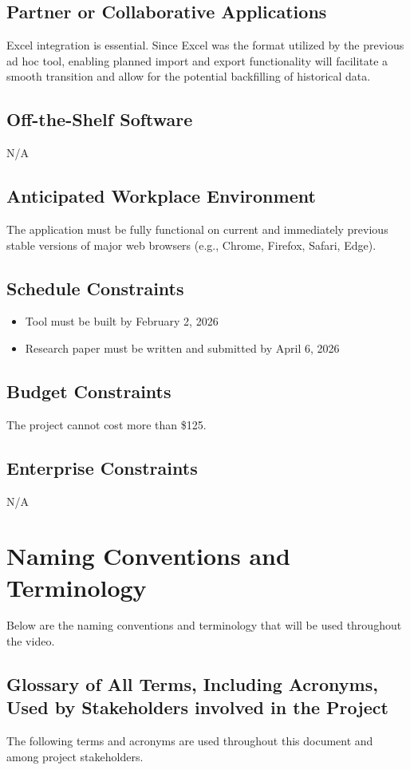 \documentclass[12pt]{article}
\begin{document}
\subsection{Partner or Collaborative Applications}
Excel integration is essential. Since Excel was the format utilized by the previous ad hoc tool, enabling planned import and export functionality will facilitate a smooth transition and allow for the potential backfilling of historical data.

\subsection{Off-the-Shelf Software}
N/A
\subsection{Anticipated Workplace Environment}
The application must be fully functional on current and immediately previous stable versions of major web browsers (e.g., Chrome, Firefox, Safari, Edge).
\subsection{Schedule Constraints}
\begin{itemize}
  \item Tool must be built by February 2, 2026
  \item Research paper must be written and submitted by April 6, 2026
\end{itemize}
\subsection{Budget Constraints}
The project cannot cost more than \$125.
\subsection{Enterprise Constraints}
N/A
\section{Naming Conventions and Terminology}
Below are the naming conventions and terminology that will be used throughout the video.
\subsection{Glossary of All Terms, Including Acronyms, Used by Stakeholders
involved in the Project}

The following terms and acronyms are used throughout this document and among project stakeholders.
\end{document}
